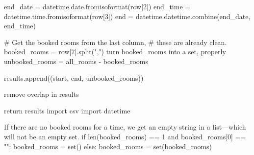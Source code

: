       end_date = datetime.date.fromisoformat(row[2])
      end_time = datetime.time.fromisoformat(row[3])
      end = datetime.datetime.combine(end_date, end_time)

      # Get the booked rooms from the last column,
      # these are already clean.
      booked_rooms = row[7].split(",")
      \LA{}turn \code{}booked{\_}rooms\edoc{} into a set, properly~{\nwtagstyle{}}\RA{}
      unbooked_rooms = all_rooms - booked_rooms

      results.append((start, end, unbooked_rooms))

  \LA{}remove overlap in \code{}results\edoc{}~{\nwtagstyle{}}\RA{}

  return results
\nwendcode{}\endmoddef\nwstartdeflinemarkup{}\nwenddeflinemarkup
import csv
import datetime
\nwendcode{}\nwdocspar

If there are no booked rooms for a time, we get an empty string in a 
list---which will not be an empty set.
\nwenddocs{}\endmoddef\nwstartdeflinemarkup{}\nwenddeflinemarkup
if len(booked_rooms) == 1 and booked_rooms[0] == "":
  booked_rooms = set()
else:
  booked_rooms = set(booked_rooms)
\nwendcode{}\nwdocspar

